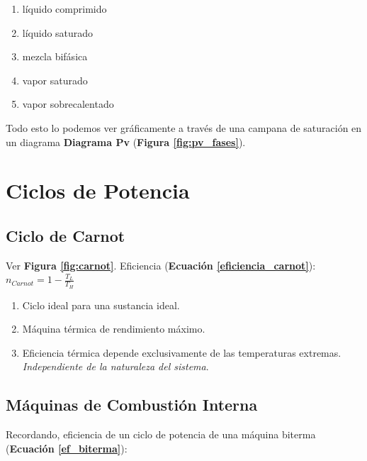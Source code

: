 \begin{enumerate}
        \begin{multicols}{3}
            \begin{enumerate}
                \item líquido comprimido
                \item líquido saturado
                \item mezcla bifásica
                \item vapor saturado
                \item vapor sobrecalentado
            \end{enumerate}
        \end{multicols}
        
        Todo esto lo podemos ver gráficamente a través de una campana de saturación en un diagrama \textbf{Diagrama Pv} (\textbf{Figura \ref{fig:pv_fases}}).
        
    \end{enumerate}

\section{Ciclos de Potencia}

    \subsection{Ciclo de Carnot}
        
        Ver \textbf{Figura \ref{fig:carnot}}. Eficiencia (\textbf{Ecuación \ref{eficiencia_carnot}}): \(n_{Carnot}=1-\frac{T_{L}}{T_{H}}\)
        
        \begin{enumerate}
            \item Ciclo ideal para una sustancia ideal.
            \item Máquina térmica de rendimiento máximo.
            \item Eficiencia térmica depende exclusivamente de las temperaturas extremas. \textit{Independiente de la naturaleza del sistema}.
        \end{enumerate}

    \subsection{Máquinas de Combustión Interna}

    Recordando, eficiencia de un ciclo de potencia de una máquina biterma (\textbf{Ecuación \ref{ef_biterma}}):
    
